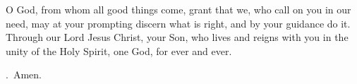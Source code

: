 \lettrine[lines=3]{O}{} God, from whom all good things come, 
grant that we, who call on you in our need,
may at your prompting discern what is right,
and by your guidance do it.
Through our Lord Jesus Christ, your Son,
who lives and reigns with you in the unity of the Holy Spirit,
one God, for ever and ever. \par \Rbar.~Amen.
